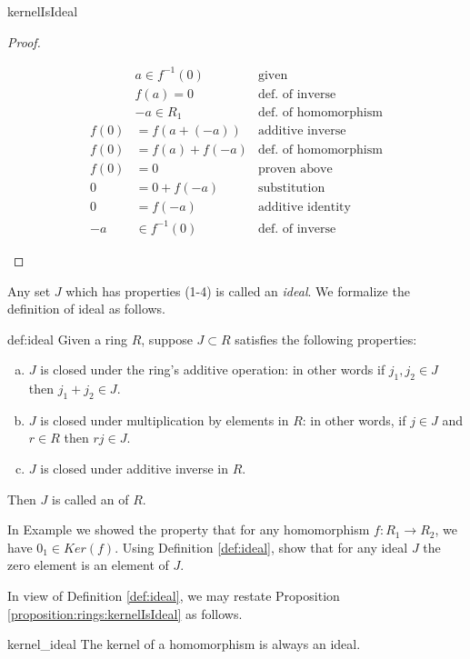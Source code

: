 \begin{prop}{kernelIsIdeal}
\begin{proof}
\begin{enumerate}
\begin{align*}
&a\in f^{-1}(0) & \text{given}\\
&f(a)=0 & \text{def. of inverse}\\
&-a\in R_1 & \text{def. of homomorphism}\\
f(0)&=f(a+(-a)) & \text{additive inverse}\\
f(0)&=f(a)+f(-a) & \text{def. of homomorphism}\\
f(0)&=0 & \text{proven above}\\
0&=0+f(-a) & \text{substitution}\\
0&=f(-a) & \text{additive identity}\\
-a&\in f^{-1}(0) & \text{def. of inverse}
\end{align*}
\end{enumerate}
\end{proof}
\end{prop}

Any set $J$ which has properties (1-4) is called an \textit{ideal}.  We formalize the definition of ideal as follows.

\begin{defn}{def:ideal}
Given a ring $R$, suppose $J \subset R$ satisfies the following properties:
\begin{enumerate}[(a)]
\item $J$ is closed under the ring's additive operation:  in other words if $j_1,j_2\in J$ then $j_1+j_2\in J$.
\item $J$ is closed under multiplication by elements in $R$:  in other words, if $j\in J$ and $r\in R$ then $rj\in J$.
\item $J$ is closed under additive inverse in $R$.
\end{enumerate}
Then $J$ is called an  of $R$.
\end{defn}

\begin{exercise}{}
In Example we showed the property that for any homomorphism $f:R_1\rightarrow R_2$, we have $0_1\in Ker(f)$.  Using Definition \ref{def:ideal}, show that for any ideal $J$ the zero element is an element of $J$. 
\end{exercise}

In view of Definition \ref{def:ideal}, we may restate Proposition \ref{proposition:rings:kernelIsIdeal} as follows.

\begin{prop}{kernel_ideal}
The kernel of a homomorphism is always an ideal.
\end{prop}

